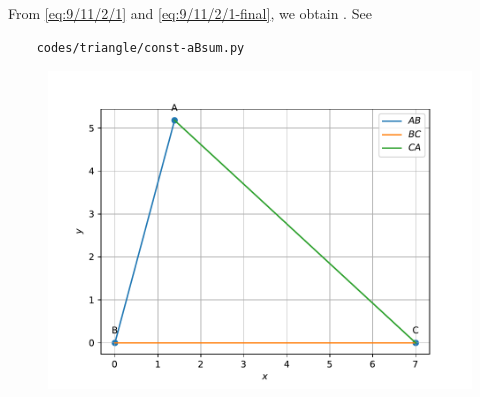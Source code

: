 		From 
		\eqref{eq:9/11/2/1}
		and 
		\eqref{eq:9/11/2/1-final},
		we obtain
		.
		See
\begin{lstlisting}
	codes/triangle/const-aBsum.py
\end{lstlisting}
	\begin{figure}[!h]
		\centering
 \includegraphics[width=\columnwidth]{chapters/9/11/2/1/figs/vector.pdf}
		\caption{}
		\label{fig:9/11/2/1}
  	\end{figure}
	
